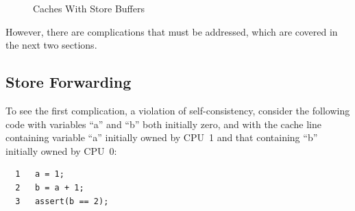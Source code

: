 \begin{figure}[htb]
\begin{center}
\end{center}
\caption{Caches With Store Buffers}
\label{fig:app:whymb:Caches With Store Buffers}
\end{figure}

However, there are complications that must be addressed, which
are covered in the next two sections.

\subsection{Store Forwarding}
\label{sec:app:whymb:Store Forwarding}

To see the first complication, a violation of self-consistency,
consider the following code with variables ``a'' and ``b'' both initially
zero, and with the cache line containing variable ``a'' initially
owned by CPU~1 and that containing ``b'' initially owned by CPU~0:

\vspace{5pt}
\begin{minipage}[t]{\columnwidth}
\small
\begin{verbatim}
  1   a = 1;
  2   b = a + 1;
  3   assert(b == 2);
\end{verbatim}
\end{minipage}
\vspace{5pt}

